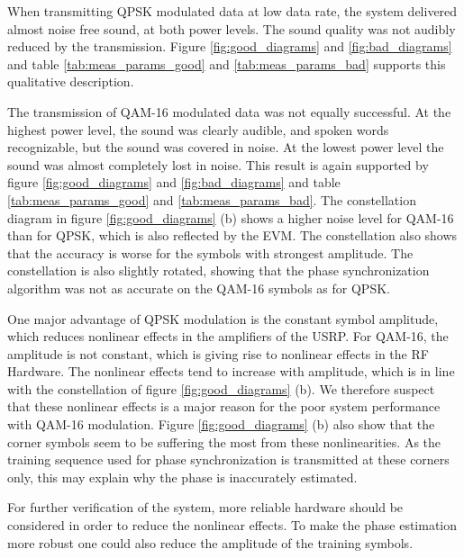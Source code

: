 When transmitting QPSK modulated data at low data rate, the system delivered almost noise free sound, at both power levels. The sound quality was not audibly reduced by the transmission. Figure \ref{fig:good_diagrams} and \ref{fig:bad_diagrams} and table \ref{tab:meas_params_good} and \ref{tab:meas_params_bad} supports this qualitative description. 

The transmission of QAM-16 modulated data was not equally successful. At the highest power level, the sound was clearly audible, and spoken words recognizable, but the sound was covered in noise. At the lowest power level the sound was almost completely lost in noise. This result is again supported by figure \ref{fig:good_diagrams} and \ref{fig:bad_diagrams} and table \ref{tab:meas_params_good} and \ref{tab:meas_params_bad}. The constellation diagram in figure \ref{fig:good_diagrams} (b) shows a higher noise level for QAM-16 than for QPSK, which is also reflected by the EVM. The constellation also shows that the accuracy is worse for the symbols with strongest amplitude. The constellation is also slightly rotated, showing that the phase synchronization algorithm was not as accurate on the QAM-16 symbols as for QPSK. 

One major advantage of QPSK modulation is the constant symbol amplitude, which reduces nonlinear effects in the amplifiers of the USRP. For QAM-16, the amplitude is not constant, which is giving rise to nonlinear effects in the RF Hardware. The nonlinear effects tend to increase with amplitude, which is in line with the constellation of figure \ref{fig:good_diagrams} (b). We therefore suspect that these nonlinear effects is a major reason for the poor system performance with QAM-16 modulation. Figure \ref{fig:good_diagrams} (b) also show that the corner symbols seem to be suffering the most from these nonlinearities. As the training sequence used for phase synchronization is transmitted at these corners only, this may explain why the phase is inaccurately estimated. 

For further verification of the system, more reliable hardware should be considered in order to reduce the nonlinear effects. To make the phase estimation more robust one could also reduce the amplitude of the training symbols.  



